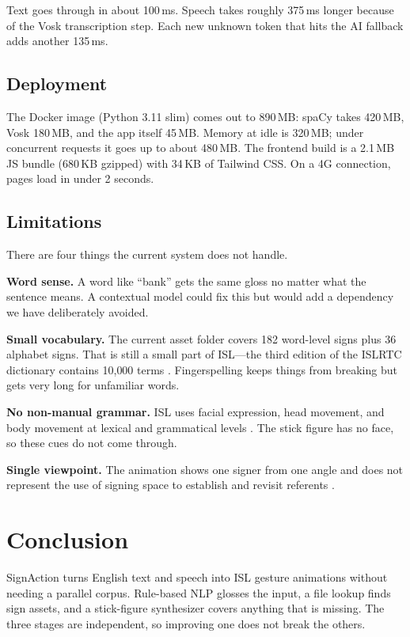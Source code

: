 \documentclass[conference]{IEEEtran}
\begin{document}
Text goes through in about 100\,ms. Speech takes roughly 375\,ms longer because of the Vosk transcription step. Each new unknown token that hits the AI fallback adds another 135\,ms.

\subsection{Deployment}

The Docker image (Python 3.11 slim) comes out to 890\,MB: spaCy takes 420\,MB, Vosk 180\,MB, and the app itself 45\,MB. Memory at idle is 320\,MB; under concurrent requests it goes up to about 480\,MB. The frontend build is a 2.1\,MB JS bundle (680\,KB gzipped) with 34\,KB of Tailwind CSS. On a 4G connection, pages load in under 2 seconds.

\subsection{Limitations}

There are four things the current system does not handle.

\textbf{Word sense.} A word like ``bank'' gets the same gloss no matter what the sentence means. A contextual model could fix this but would add a dependency we have deliberately avoided.

\textbf{Small vocabulary.} The current asset folder covers 182 word-level signs plus 36 alphabet signs. That is still a small part of ISL---the third edition of the ISLRTC dictionary contains 10{,}000 terms \cite{islrtc2021}. Fingerspelling keeps things from breaking but gets very long for unfamiliar words.

\textbf{No non-manual grammar.} ISL uses facial expression, head movement, and body movement at lexical and grammatical levels \cite{joshi2024isign}. The stick figure has no face, so these cues do not come through.

\textbf{Single viewpoint.} The animation shows one signer from one angle and does not represent the use of signing space to establish and revisit referents \cite{joshi2024isign}.

\section{Conclusion}
\label{sec:conclude}

SignAction turns English text and speech into ISL gesture animations without needing a parallel corpus. Rule-based NLP glosses the input, a file lookup finds sign assets, and a stick-figure synthesizer covers anything that is missing. The three stages are independent, so improving one does not break the others.
\end{document}
